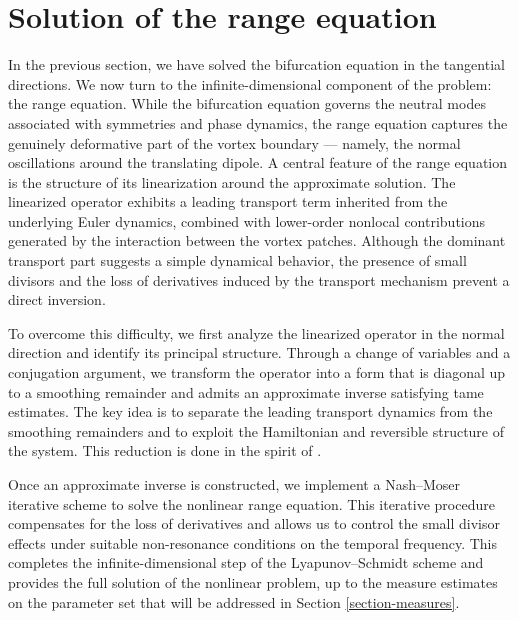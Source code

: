 \documentclass[a4paper,reqno,10pt]{article}
\begin{document}




\section{Solution of the range equation}\label{section.normal}
In the previous section, we have  solved the bifurcation equation in the tangential directions. We now turn to the infinite-dimensional component of the problem: the range equation. While the bifurcation equation governs the neutral modes associated with symmetries and phase dynamics, the range equation captures the genuinely deformative part of the vortex boundary — namely, the normal oscillations around the translating dipole.
A central feature of the range equation is the structure of its linearization around the approximate solution. The linearized operator exhibits a leading transport term inherited from the underlying Euler dynamics, combined with lower-order nonlocal contributions generated by the interaction between the vortex patches. Although the dominant transport part suggests a simple dynamical behavior, the presence of small divisors and the loss of derivatives induced by the transport mechanism prevent a direct inversion.

To overcome this difficulty, we first analyze the linearized operator in the normal direction and identify its principal structure. Through a change of variables and a conjugation argument, we transform the operator into a form that is diagonal up to a smoothing remainder and admits an approximate inverse satisfying tame estimates. The key idea is to separate the leading transport dynamics from the smoothing remainders and to exploit the Hamiltonian and reversible structure of the system. This reduction is done in the spirit of \cite{BM20, BFM24, FMT25, HHM21, HR21}.

Once an approximate inverse is constructed, we implement a Nash–Moser iterative scheme to solve the nonlinear range equation. This iterative procedure compensates for the loss of derivatives and allows us to control the small divisor effects under suitable non-resonance conditions on the temporal frequency. 
This completes the infinite-dimensional step of the Lyapunov–Schmidt scheme and provides the full solution of the nonlinear problem, up to the measure estimates on the parameter set that will be addressed in Section \ref{section-measures}.
\end{document}

